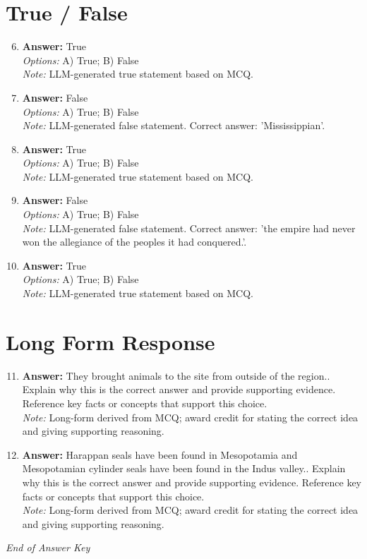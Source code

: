 \documentclass[12pt]{article}
\begin{document}
\section*{True / False}
\begin{enumerate}[label=\arabic*.]
\setcounter{enumi}{5}
\item \textbf{Answer:} True
\\ \textit{Options:} A) True; B) False
\\ \textit{Note:} LLM-generated true statement based on MCQ.
\item \textbf{Answer:} False
\\ \textit{Options:} A) True; B) False
\\ \textit{Note:} LLM-generated false statement. Correct answer: 'Mississippian'.
\item \textbf{Answer:} True
\\ \textit{Options:} A) True; B) False
\\ \textit{Note:} LLM-generated true statement based on MCQ.
\item \textbf{Answer:} False
\\ \textit{Options:} A) True; B) False
\\ \textit{Note:} LLM-generated false statement. Correct answer: 'the empire had never won the allegiance of the peoples it had conquered.'.
\item \textbf{Answer:} True
\\ \textit{Options:} A) True; B) False
\\ \textit{Note:} LLM-generated true statement based on MCQ.
\end{enumerate}

\section*{Long Form Response}
\begin{enumerate}[label=\arabic*.]
\setcounter{enumi}{10}
\item \textbf{Answer:} They brought animals to the site from outside of the region.. Explain why this is the
correct answer and provide supporting evidence. Reference key facts or concepts that
support this choice.
\\ \textit{Note:} Long-form derived from MCQ; award credit for stating the correct idea and giving supporting reasoning.
\item \textbf{Answer:} Harappan seals have been found in Mesopotamia and Mesopotamian cylinder seals have been
found in the Indus valley.. Explain why this is the correct answer and provide supporting
evidence. Reference key facts or concepts that support this choice.
\\ \textit{Note:} Long-form derived from MCQ; award credit for stating the correct idea and giving supporting reasoning.
\end{enumerate}

\vfill
\noindent\textit{End of Answer Key}
\end{document}
